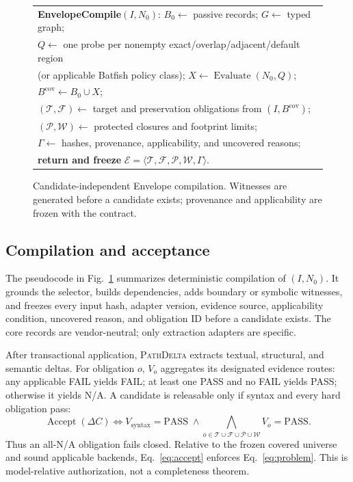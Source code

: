 \documentclass[conference]{IEEEtran}
\newcommand{\system}{\textsc{PathDelta}\xspace}
\newcommand{\env}{\mathcal{E}}
\newcommand{\target}{\mathcal{T}}
\newcommand{\semframe}{\mathcal{F}}
\newcommand{\deps}{\mathcal{P}}
\newcommand{\budget}{\mathcal{W}}
\newcommand{\na}{\textsc{N/A}\xspace}
\begin{document}
\begin{figure}[t]
\centering
\scriptsize
\begin{tabular}{@{}l@{}}
\textbf{EnvelopeCompile}$(I,N_0)$: $B_0\leftarrow$ passive records; $G\leftarrow$ typed graph;\\
$Q\leftarrow$ one probe per nonempty exact/overlap/adjacent/default region\\
\hspace*{1.2em}(or applicable Batfish policy class); $X\leftarrow\operatorname{Evaluate}(N_0,Q)$;\\
$B^{\mathrm{cov}}\leftarrow B_0\cup X$;\\
$(\target,\semframe)\leftarrow$ target and preservation obligations from $(I,B^{\mathrm{cov}})$;\\
$(\deps,\budget)\leftarrow$ protected closures and footprint limits;\\
$\Gamma\leftarrow$ hashes, provenance, applicability, and uncovered reasons;\\
\textbf{return and freeze }$\env=\langle\target,\semframe,\deps,\budget,\Gamma\rangle$.\\
\end{tabular}
\caption{Candidate-independent Envelope compilation.  Witnesses are generated
before a candidate exists; provenance and applicability are frozen with the contract.}
\label{fig:compile}
\end{figure}

\subsection{Compilation and acceptance}

The pseudocode in Fig.~\ref{fig:compile} summarizes deterministic compilation of
$(I,N_0)$.  It grounds the selector, builds dependencies, adds boundary or
symbolic witnesses, and freezes every input hash, adapter version, evidence
source, applicability condition, uncovered reason, and obligation ID before a
candidate exists.  The core records are vendor-neutral; only extraction
adapters are specific.

After transactional application, \system extracts textual, structural, and
semantic deltas.  For obligation $o$, $V_o$ aggregates its designated evidence
routes: any applicable FAIL yields FAIL; at least one PASS and no FAIL yields
PASS; otherwise it yields \na.  A candidate is releasable only if syntax and
every hard obligation pass:
\begin{equation}
 \operatorname{Accept}(\Delta C) \Leftrightarrow
 V_{\mathrm{syntax}}=\mathrm{PASS}\;\land\!
 \bigwedge_{o\in\target\cup\semframe\cup\deps\cup\budget} V_o=\mathrm{PASS}.
 \label{eq:accept}
\end{equation}
Thus an all-\na obligation fails closed.  Relative to the
frozen covered universe and sound applicable backends, Eq.~\ref{eq:accept}
enforces Eq.~\ref{eq:problem}.  This is model-relative authorization, not a
completeness theorem.
\end{document}
